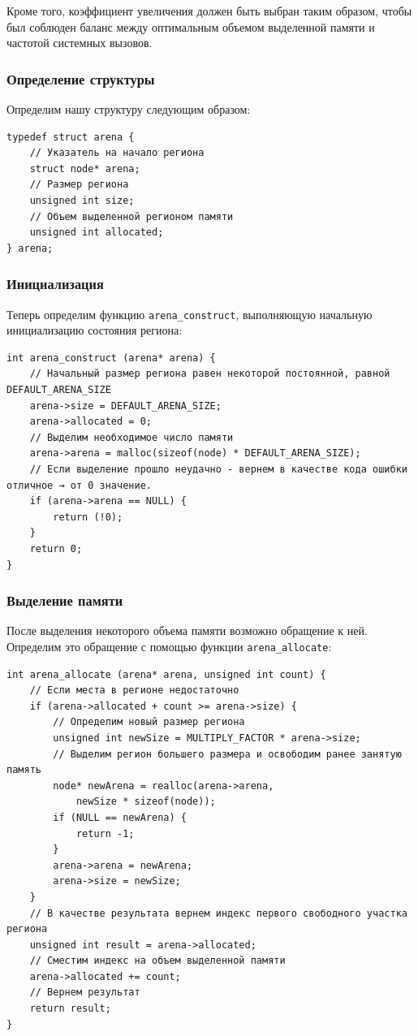 \documentclass[bachelor, och, otchet]{SCWorks}
\begin{document}
Кроме того, коэффициент увеличения должен быть выбран таким образом, чтобы был
соблюден баланс между оптимальным объемом выделенной памяти и частотой системных
вызовов.

\subsubsection{Определение структуры}
Определим нашу структуру следующим образом:

\begin{verbatim}
typedef struct arena { 
    // Указатель на начало региона 
    struct node* arena; 
    // Размер региона 
    unsigned int size; 
    // Объем выделенной регионом памяти
    unsigned int allocated; 
} arena;
\end{verbatim}

\subsubsection{Инициализация}
Теперь определим функцию \verb|arena_construct|, выполняющую начальную
инициализацию состояния региона:

\begin{verbatim}
int arena_construct (arena* arena) { 
    // Начальный размер региона равен некоторой постоянной, равной DEFAULT_ARENA_SIZE 
    arena->size = DEFAULT_ARENA_SIZE;
    arena->allocated = 0; 
    // Выделим необходимое число памяти 
    arena->arena = malloc(sizeof(node) * DEFAULT_ARENA_SIZE); 
    // Если выделение прошло неудачно - вернем в качестве кода ошибки отличное → от 0 значение. 
    if (arena->arena == NULL) { 
        return (!0); 
    } 
    return 0; 
}
\end{verbatim}

\subsubsection{Выделение памяти}
После выделения некоторого объема памяти возможно обращение к ней. Определим это
обращение с помощью функции \verb|arena_allocate|:

\begin{verbatim}
int arena_allocate (arena* arena, unsigned int count) { 
    // Если места в регионе недостаточно 
    if (arena->allocated + count >= arena->size) { 
        // Определим новый размер региона 
        unsigned int newSize = MULTIPLY_FACTOR * arena->size;
        // Выделим регион большего размера и освободим ранее занятую память 
        node* newArena = realloc(arena->arena, 
            newSize * sizeof(node)); 
        if (NULL == newArena) { 
            return -1; 
        } 
        arena->arena = newArena; 
        arena->size = newSize; 
    }
    // В качестве результата вернем индекс первого свободного участка региона
    unsigned int result = arena->allocated; 
    // Сместим индекс на объем выделенной памяти 
    arena->allocated += count; 
    // Вернем результат 
    return result; 
}
\end{verbatim}
\end{document}
